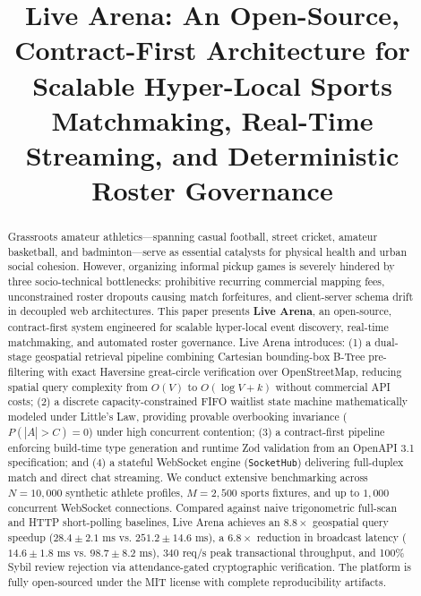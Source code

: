 \documentclass[conference]{IEEEtran}
\begin{document}
\title{Live Arena: An Open-Source, Contract-First Architecture for Scalable Hyper-Local Sports Matchmaking, Real-Time Streaming, and Deterministic Roster Governance}

\author{
\and
{}
}

\maketitle

\begin{abstract}
Grassroots amateur athletics—spanning casual football, street cricket, amateur basketball, and badminton—serve as essential catalysts for physical health and urban social cohesion. However, organizing informal pickup games is severely hindered by three socio-technical bottlenecks: prohibitive recurring commercial mapping fees, unconstrained roster dropouts causing match forfeitures, and client-server schema drift in decoupled web architectures. This paper presents \textbf{Live Arena}, an open-source, contract-first system engineered for scalable hyper-local event discovery, real-time matchmaking, and automated roster governance. Live Arena introduces: (1) a dual-stage geospatial retrieval pipeline combining Cartesian bounding-box B-Tree pre-filtering with exact Haversine great-circle verification over OpenStreetMap, reducing spatial query complexity from $O(V)$ to $O(\log V + k)$ without commercial API costs; (2) a discrete capacity-constrained FIFO waitlist state machine mathematically modeled under Little's Law, providing provable overbooking invariance ($P(|A| > C) = 0$) under high concurrent contention; (3) a contract-first pipeline enforcing build-time type generation and runtime Zod validation from an OpenAPI 3.1 specification; and (4) a stateful WebSocket engine (\texttt{SocketHub}) delivering full-duplex match and direct chat streaming. We conduct extensive benchmarking across $N = 10,000$ synthetic athlete profiles, $M = 2,500$ sports fixtures, and up to $1,000$ concurrent WebSocket connections. Compared against naive trigonometric full-scan and HTTP short-polling baselines, Live Arena achieves an $8.8\times$ geospatial query speedup ($28.4\pm 2.1\text{ ms}$ vs. $251.2\pm 14.6\text{ ms}$), a $6.8\times$ reduction in broadcast latency ($14.6\pm 1.8\text{ ms}$ vs. $98.7\pm 8.2\text{ ms}$), $340\text{ req/s}$ peak transactional throughput, and 100\% Sybil review rejection via attendance-gated cryptographic verification. The platform is fully open-sourced under the MIT license with complete reproducibility artifacts.
\end{abstract}
\end{document}
